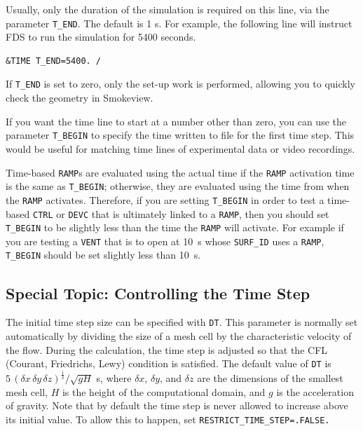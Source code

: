 \documentclass[11pt]{book}
\newcommand{\ct}{\tt\small}
\newcommand{\dx}{\delta x}
\newcommand{\dy}{\delta y}
\newcommand{\dz}{\delta z}
\newcommand{\ot}{\frac{1}{3}}
\begin{document}
Usually, only the
duration of the simulation is required on this line, via the
parameter {\ct T\_END}. The default is 1 s.
For example, the following line will instruct FDS to run the simulation for 5400 seconds.

\footnotesize
\begin{verbatim}
&TIME T_END=5400. /
\end{verbatim}

\normalsize
\noindent If {\ct T\_END} is set to zero, only the set-up work is performed,
allowing you to quickly check the geometry in Smokeview.

If you want the time line to start at a number other than zero, you can use the parameter
{\ct T\_BEGIN} to specify the time written to file for the first time step.
This would be useful for matching time lines of experimental data or video recordings.

\begin{warning}
Time-based {\ct RAMP}s are evaluated using the actual time if the {\ct RAMP} activation time is the same as
{\ct T\_BEGIN}; otherwise, they are evaluated using the time from when the {\ct RAMP} activates.  Therefore, if you are
setting {\ct T\_BEGIN} in order to test a time-based {\ct CTRL} or {\ct DEVC} that is ultimately
linked to a {\ct RAMP}, then you should set {\ct T\_BEGIN} to be slightly less than the time the {\ct RAMP} will activate.
For example if you are testing a {\ct VENT} that is to open at 10~s whose {\ct SURF\_ID} uses a {\ct RAMP},
{\ct T\_BEGIN} should be set slightly less than 10~s.
\end{warning}

\subsection{Special Topic: Controlling the Time Step}
\label{info:TIME_Control}

The initial time step size can be specified with
{\ct DT}. This parameter is normally set automatically by dividing the size of a mesh cell by the
characteristic velocity of the flow.
During the calculation, the time step is adjusted so that the CFL (Courant, Friedrichs, Lewy) condition is
satisfied. The default value of {\ct DT} is $5 \, (\dx \, \dy \, \dz)^\ot/\sqrt{gH}$ s, where
$\dx$, $\dy$, and $\dz$ are the dimensions of the smallest mesh
cell, $H$ is the height of the computational domain, and $g$ is the acceleration of gravity. Note that by default the
time step is never allowed to increase above its initial value. To allow this to happen, set
{\ct RESTRICT\_TIME\_STEP=.FALSE.}
\end{document}
